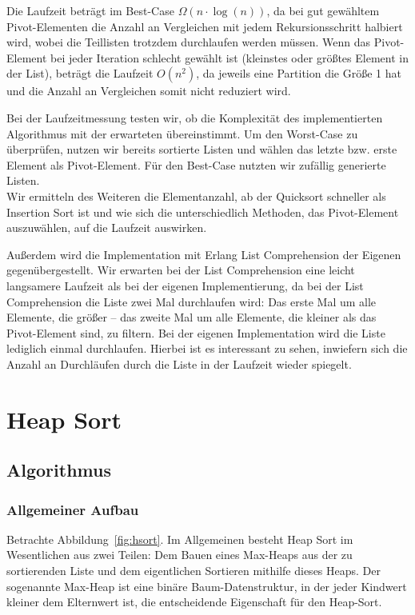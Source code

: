 \documentclass[11pt]{article}
\begin{document}
    Die Laufzeit beträgt im Best-Case \(\Omega (n \cdot \log(n))\), da bei
    gut gewähltem Pivot-Elementen die Anzahl an Vergleichen mit jedem
    Rekursionsschritt halbiert wird, wobei die Teillisten trotzdem durchlaufen
    werden müssen.
    Wenn das Pivot-Element bei jeder Iteration schlecht gewählt ist (kleinstes
    oder größtes Element in der List), beträgt die Laufzeit \(O(n^2)\), da
    jeweils eine Partition die Größe 1 hat und die Anzahl an Vergleichen
    somit nicht reduziert wird.

    Bei der Laufzeitmessung testen wir, ob die Komplexität des implementierten
    Algorithmus mit der erwarteten übereinstimmt.
    Um den Worst-Case zu überprüfen, nutzen wir bereits sortierte Listen und
    wählen das letzte bzw. erste Element als Pivot-Element.
    Für den Best-Case nutzten wir zufällig generierte Listen.\\

    Wir ermitteln des Weiteren die Elementanzahl, ab der Quicksort schneller
    als Insertion Sort ist und wie sich die unterschiedlich Methoden, das
    Pivot-Element auszuwählen, auf die Laufzeit auswirken.

    Außerdem wird die Implementation mit Erlang List Comprehension der
    Eigenen gegenübergestellt.
    Wir erwarten bei der List Comprehension eine leicht langsamere Laufzeit als
    bei der eigenen Implementierung, da bei der List Comprehension die Liste
    zwei Mal durchlaufen wird:
    Das erste Mal um alle Elemente, die größer -- das zweite Mal
    um alle Elemente, die kleiner als das Pivot-Element sind, zu filtern.
    Bei der eigenen Implementation wird die Liste lediglich einmal
    durchlaufen.
    Hierbei ist es interessant zu sehen, inwiefern sich die Anzahl an
    Durchläufen durch die Liste in der Laufzeit wieder spiegelt.


    \section{Heap Sort}\label{sec:heap-sort}

    \subsection{Algorithmus}\label{subsec:Halgorithmus}

    \subsubsection{Allgemeiner Aufbau}
    Betrachte Abbildung~\ref{fig:hsort}.
    Im Allgemeinen besteht Heap Sort im Wesentlichen aus zwei Teilen:
    Dem Bauen eines Max-Heaps aus der zu sortierenden Liste und dem
    eigentlichen Sortieren mithilfe dieses Heaps.
    Der sogenannte Max-Heap ist eine binäre Baum-Datenstruktur, in der jeder
    Kindwert kleiner dem Elternwert ist, die entscheidende Eigenschaft für
    den Heap-Sort.
\end{document}
